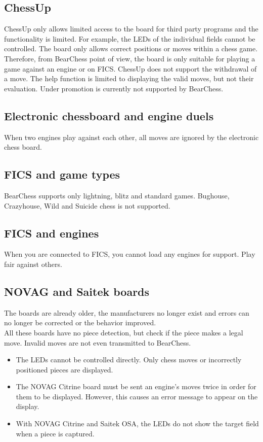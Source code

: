 \documentclass[11pt,a4paper]{article}
\begin{document}
\subsection{ChessUp}
ChessUp only allows limited access to the board for third party programs and the functionality is limited. For example, the LEDs of the individual fields cannot be controlled. The board only allows correct positions or moves within a chess game. Therefore, from BearChess point of view, the board is only suitable for playing a game against an engine or on FICS. ChessUp does not support the withdrawal of a move. The help function is limited to displaying the valid moves, but not their evaluation. Under promotion is currently not supported by BearChess.

\subsection{Electronic chessboard and engine duels}
When two engines play against each other, all moves are ignored by the electronic chess board.

\subsection{FICS and game types}
BearChess supports only lightning, blitz and standard games. Bughouse, Crazyhouse, Wild and Suicide chess is not supported.

\subsection{FICS and engines}
When you are connected to FICS, you cannot load any engines for support. Play fair against others.

\subsection{NOVAG and Saitek boards}
The boards are already older, the manufacturers no longer exist and errors can no longer be corrected or the behavior improved.\\
All these boards have no piece detection, but check if the piece makes a legal move. Invalid moves are not even transmitted to BearChess.
\begin{itemize}
	\item The LEDs cannot be controlled directly. Only chess moves or incorrectly positioned pieces are displayed.
	\item The NOVAG Citrine board must be sent an engine's moves twice in order for them to be displayed. However, this causes an error message to appear on the display.
	\item With NOVAG Citrine and Saitek OSA, the LEDs do not show the target field when a piece is captured.
\end{itemize}
\end{document}
